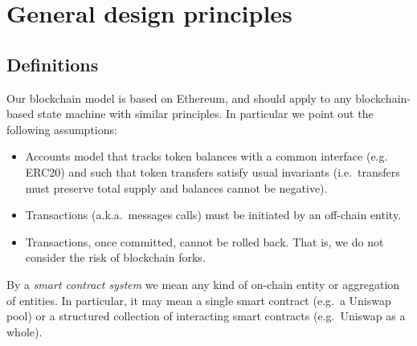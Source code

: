 \documentclass[a4paper,10pt]{article}
\begin{document}
\section{General design principles}


\subsection{Definitions}

Our blockchain model is based on Ethereum, and should apply to any blockchain-based state machine with similar principles.
%
In particular we point out the following assumptions:
\begin{itemize}
\item Accounts model that tracks token balances with a common interface (e.g. ERC20) and such that token transfers satisfy usual invariants (i.e.~transfers must preserve total supply and balances cannot be negative).
\item Transactions (a.k.a.~messages calls) must be initiated by an off-chain entity.
\item Transactions, once committed, cannot be rolled back. That is, we do not consider the risk of blockchain forks.
\end{itemize}
By a \emph{smart contract system} we mean any kind of on-chain entity or aggregation of entities. In particular, it may mean a single smart contract (e.g.~a Uniswap pool) or a structured collection of interacting smart contracts (e.g.~Uniswap as a whole).
\end{document}
